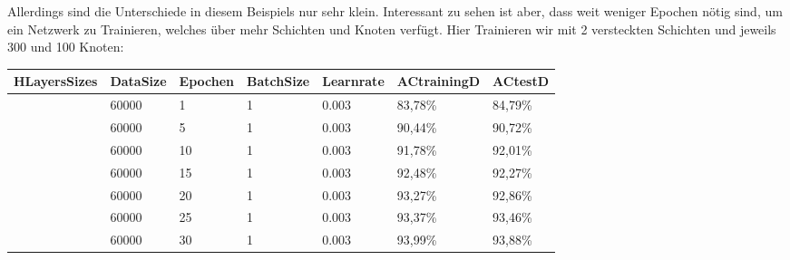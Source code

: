 \documentclass[12pt]{article}
\begin{document}
	Allerdings sind die Unterschiede in diesem Beispiels nur sehr klein. Interessant zu sehen ist aber, dass weit weniger Epochen nötig sind, um ein Netzwerk zu Trainieren, welches über mehr Schichten und Knoten verfügt. Hier Trainieren wir mit 2 versteckten Schichten und jeweils 300 und 100 Knoten:
\begin{table}[H]
    \centering
    \begin{tabular}{|l|l|l|l|l|l|l|}
    \hline
        HLayersSizes & DataSize & Epochen & BatchSize & Learnrate & ACtrainingD & ACtestD \\ \hline
        [784, 300, 100, 10] & 60000 & 1 & 1 & 0.003 & 83,78\% & 84,79\% \\ \hline
        [784, 300, 100, 10] & 60000 & 5 & 1 & 0.003 & 90,44\% & 90,72\% \\ \hline
        [784, 300, 100, 10] & 60000 & 10 & 1 & 0.003 & 91,78\% & 92,01\% \\ \hline
        [784, 300, 100, 10] & 60000 & 15 & 1 & 0.003 & 92,48\% & 92,27\% \\ \hline
        [784, 300, 100, 10] & 60000 & 20 & 1 & 0.003 & 93,27\% & 92,86\% \\ \hline
        [784, 300, 100, 10] & 60000 & 25 & 1 & 0.003 & 93,37\% & 93,46\% \\ \hline
        [784, 300, 100, 10] & 60000 & 30 & 1 & 0.003 & 93,99\% & 93,88\% \\ \hline
    \end{tabular}
\end{table}
\end{document}
